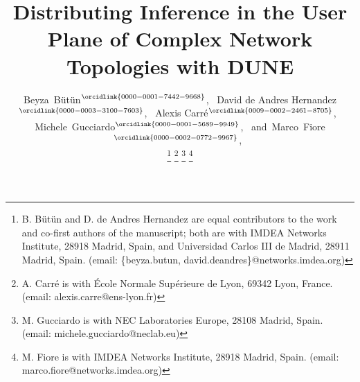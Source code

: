 \documentclass[journal]{IEEEtran}
\theoremstyle{plain} %
\begin{document}
%

\title{Distributing Inference in the User Plane of Complex Network Topologies with DUNE}
%
%
%

\author{
Beyza~B\"{u}t\"{u}n$^{\orcidlink{0000-0001-7442-9668}}$,~
David de Andres Hernandez$^{\orcidlink{0000-0003-3100-7603}}$,~
Alexis Carré$^{\orcidlink{0009-0002-2461-8705}}$,~\IEEEmembership{}
Michele~Gucciardo$^{\orcidlink{0000-0001-5689-9949}}$,~
and~Marco~Fiore$^{\orcidlink{0000-0002-0772-9967}}$,~%
        
\thanks{B. B\"{u}t\"{u}n and D. de Andres Hernandez are equal contributors to the work and co-first authors of the manuscript; both are with IMDEA Networks Institute, 28918 Madrid, Spain, and Universidad Carlos III de Madrid, 28911 Madrid, Spain. (email: \{beyza.butun, david.deandres\}@networks.imdea.org)}%
\thanks{A. Carré is with École Normale Supérieure de Lyon, 69342 Lyon, France. (email: alexis.carre@ens-lyon.fr)}%
\thanks{M. Gucciardo is with NEC Laboratories Europe, 28108 Madrid, Spain. (email: michele.gucciardo@neclab.eu)}%
\thanks{M. Fiore  is with IMDEA Networks Institute, 28918 Madrid, Spain. (email: marco.fiore@networks.imdea.org)}%

\vspace*{-20pt}
}
\end{document}
